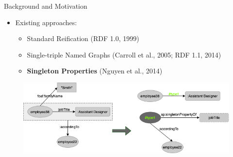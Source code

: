 \documentclass[aspectratio=169]{beamer}
\begin{document}
\begin{frame}{Background and Motivation}
    \begin{itemize}
        \item Existing approaches:
            \begin{itemize}
                \item Standard Reification (RDF 1.0, 1999)
                \item Single-triple Named Graphs (Carroll et al., 2005; RDF 1.1, 2014)
                \item \textbf{Singleton Properties} (Nguyen et al., 2014)
            \end{itemize}
    \end{itemize}
    \begin{figure}
        \centering
        \includegraphics[scale=0.5]{images/Example-2-To-SingletonProperties.png}
    \end{figure}
\end{frame}
\end{document}
